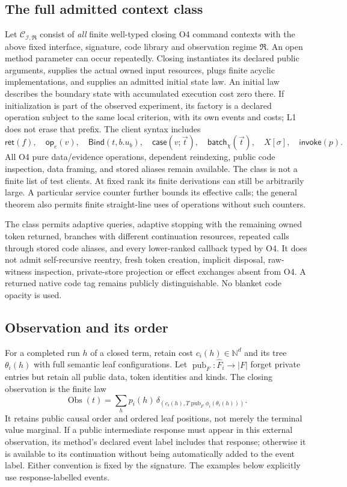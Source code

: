 \documentclass[11pt,a4paper]{article}
\theoremstyle{definition}
\newcommand{\Obs}{\operatorname{Obs}}
\newcommand{\Ret}{\mathsf{ret}}
\newcommand{\Bind}{\mathsf{Bind}}
\newcommand{\Batch}{\mathsf{batch}}
\newcommand{\Op}{\mathsf{op}}
\newcommand{\Invoke}{\mathsf{invoke}}
\begin{document}
\subsection{The full admitted context class}\label{sec:contexts}
Let $\mathcal C_{\mathcal I,\mathfrak R}$ consist of \emph{all} finite
well-typed closing O4 command contexts with the above fixed interface,
signature, code library and observation regime $\mathfrak R$. An open
method parameter can occur repeatedly. Closing instantiates its declared
public arguments, supplies the actual owned input resources, plugs finite
acyclic implementations, and supplies an admitted initial state law.
An initial law describes the boundary state with accumulated execution
cost zero there. If initialization is part of the observed experiment,
its factory is a declared operation subject to the same local criterion,
with its own events and costs; L1 does not erase that prefix.
The client syntax includes
\[
 \Ret(f),\quad\Op_e(v),\quad\Bind(t,b.u_b),\quad
 \mathsf{case}(v;\vec t),\quad\Batch_\chi(\vec t),\quad
 X[\sigma],\quad\Invoke(p).
\]
All O4 pure data/evidence operations, dependent reindexing, public code
inspection, data framing, and stored aliases remain available. The class
is not a finite list of test clients. At fixed rank its finite derivations
can still be arbitrarily large. A particular service counter further
bounds its effective calls; the general theorem also permits finite
straight-line uses of operations without such counters.

The class permits adaptive queries, adaptive stopping with the remaining
owned token returned, branches with different continuation resources,
repeated calls through stored code aliases, and every lower-ranked
callback typed by O4. It does not admit self-recursive reentry, fresh
token creation, implicit disposal, raw-witness inspection, private-store
projection or effect exchanges absent from O4. A returned native code
tag remains publicly distinguishable. No blanket code opacity is used.

\subsection{Observation and its order}\label{sec:observations}
For a completed run $h$ of a closed term, retain cost
$c_i(h)\in\mathbb N^d$ and its tree $\theta_i(h)$ with full semantic
leaf configurations. Let $\operatorname{pub}_F:\widehat F_i\to|F|$
forget private entries but retain all public data, token identities and
kinds. The closing observation is the finite law
\begin{equation}\label{eq:observation}
 \Obs(t)=\sum_hp_i(h)\,
 \delta_{\left(c_i(h),T\operatorname{pub}_F\phi_i(\theta_i(h))\right)}.
\end{equation}
It retains public causal order and ordered leaf positions, not merely the
terminal value marginal. If a public intermediate response must appear
in this external observation, its method's declared event label includes
that response; otherwise it is available to its continuation without
being automatically added to the event label. Either convention is fixed
by the signature. The examples below explicitly use response-labelled
events.
\end{document}
